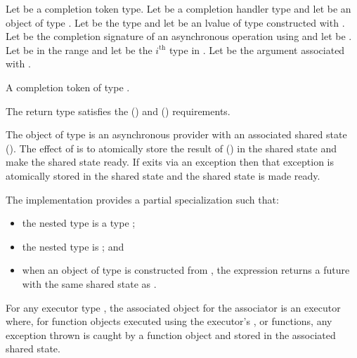 \begin{itemdescr}
\pnum
Let  be a completion token type. Let  be a completion handler type and let  be an object of type . Let  be the type  and let  be an lvalue of type  constructed with . Let  be the completion signature of an asynchronous operation using  and let  be . Let  be in the range  and let  be the $i^\text{th}$ type in . Let  be the argument associated with .

\pnum
\returns A completion token  of type .

\pnum
\remarks The return type  satisfies the  () and  () requirements.

\pnum
The object  of type  is an asynchronous provider with an associated shared state (). The effect of  is to atomically store the result of  () in the shared state and make the shared state ready. If  exits via an exception then that exception is atomically stored in the shared state and the shared state is made ready.

\pnum
The implementation provides a partial specialization  such that:
\begin{itemize}
\item
 the nested type  is a type ;
\item
 the nested type  is ; and
\item
 when an object  of type  is constructed from , the expression  returns a future with the same shared state as .
\end{itemize}

\pnum
For any executor type , the associated object for the associator  is an executor where, for function objects executed using the executor's ,  or  functions, any exception thrown is caught by a function object and stored in the associated shared state.
\end{itemdescr}



